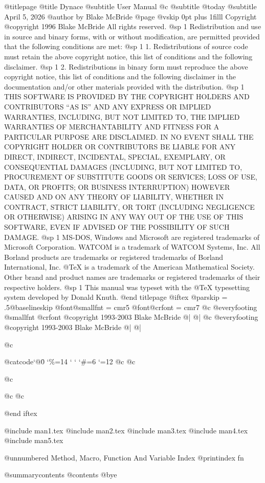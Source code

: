 @titlepage
@title Dynace
@subtitle User Manual
@c @subtitle @today{}
@subtitle April 5, 2026
@author by Blake McBride
@page
@vskip 0pt plus 1filll
Copyright  @copyright{} 1996 Blake McBride
All rights reserved.
@sp 1
Redistribution and use in source and binary forms, with or without
modification, are permitted provided that the following conditions are
met:
@sp 1
1. Redistributions of source code must retain the above copyright
notice, this list of conditions and the following disclaimer.
@sp 1
2. Redistributions in binary form must reproduce the above copyright
notice, this list of conditions and the following disclaimer in the
documentation and/or other materials provided with the distribution.
@sp 1
THIS SOFTWARE IS PROVIDED BY THE COPYRIGHT HOLDERS AND CONTRIBUTORS
``AS IS'' AND ANY EXPRESS OR IMPLIED WARRANTIES, INCLUDING, BUT NOT
LIMITED TO, THE IMPLIED WARRANTIES OF MERCHANTABILITY AND FITNESS FOR
A PARTICULAR PURPOSE ARE DISCLAIMED. IN NO EVENT SHALL THE COPYRIGHT
HOLDER OR CONTRIBUTORS BE LIABLE FOR ANY DIRECT, INDIRECT, INCIDENTAL,
SPECIAL, EXEMPLARY, OR CONSEQUENTIAL DAMAGES (INCLUDING, BUT NOT
LIMITED TO, PROCUREMENT OF SUBSTITUTE GOODS OR SERVICES; LOSS OF USE,
DATA, OR PROFITS; OR BUSINESS INTERRUPTION) HOWEVER CAUSED AND ON ANY
THEORY OF LIABILITY, WHETHER IN CONTRACT, STRICT LIABILITY, OR TORT
(INCLUDING NEGLIGENCE OR OTHERWISE) ARISING IN ANY WAY OUT OF THE USE
OF THIS SOFTWARE, EVEN IF ADVISED OF THE POSSIBILITY OF SUCH DAMAGE.
@sp 1
MS-DOS, Windows and Microsoft are registered trademarks of
Microsoft Corporation.  WATCOM is a trademark of WATCOM Systems,
Inc. All Borland products are trademarks or registered trademarks of
Borland International, Inc. @TeX{} is a trademark of the American
Mathematical Society. Other brand and product names are trademarks or
registered trademarks of their respective holders.
@sp 1
This manual was typeset with the @TeX{} typesetting system developed by
Donald Knuth.
@end titlepage
@iftex
@parskip = .5@baselineskip
@font@smallfnt = cmr5
@font@crfont = cmr7
@c @everyfooting {@smallfnt {@crfont @copyright{}} 1993-2003 Blake McBride} @| @|
@c @everyfooting { @copyright{} 1993-2003 Blake McBride} @| @|


@c {@catcode`@\=0 \catcode`\%=14 \catcode` \catcode` \catcode `\#=6 \catcode `\@=12
@c 
@c 
@c 
@c %
@c }

@end iftex


@include man1.tex
@include man2.tex
@include man3.tex
@include man4.tex
@include man5.tex


@unnumbered Method, Macro, Function And Variable Index
@printindex fn

@summarycontents
@contents
@bye

